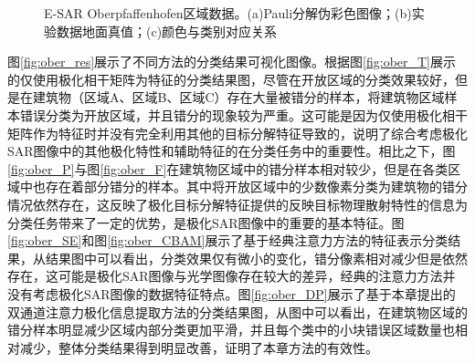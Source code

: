 \begin{figure}[ht]

    \caption{E-SAR Oberpfaffenhofen区域数据。(a)Pauli分解伪彩色图像；(b)实验数据地面真值；(c)颜色与类别对应关系}
\end{figure}

图\ref{fig:ober_res}展示了不同方法的分类结果可视化图像。根据图\ref{fig:ober_T}展示的仅使用极化相干矩阵为特征的分类结果图，尽管在开放区域的分类效果较好，但是在建筑物（区域A、区域B、区域C）存在大量被错分的样本，将建筑物区域样本错误分类为开放区域，并且错分的现象较为严重。这可能是因为仅使用极化相干矩阵作为特征时并没有完全利用其他的目标分解特征导致的，说明了综合考虑极化SAR图像中的其他极化特性和辅助特征的在分类任务中的重要性。相比之下，图\ref{fig:ober_P}与图\ref{fig:ober_F}在建筑物区域中的错分样本相对较少，但是在各类区域中也存在着部分错分的样本。其中将开放区域中的少数像素分类为建筑物的错分情况依然存在，这反映了极化目标分解特征提供的反映目标物理散射特性的信息为分类任务带来了一定的优势，是极化SAR图像中的重要的基本特征。图\ref{fig:ober_SE}和图\ref{fig:ober_CBAM}展示了基于经典注意力方法的特征表示分类结果，从结果图中可以看出，分类效果仅有微小的变化，错分像素相对减少但是依然存在，这可能是极化SAR图像与光学图像存在较大的差异，经典的注意力方法并没有考虑极化SAR图像的数据特征特点。图\ref{fig:ober_DP}展示了基于本章提出的双通道注意力极化信息提取方法的分类结果图，从图中可以看出，在建筑物区域的错分样本明显减少区域内部分类更加平滑，并且每个类中的小块错误区域数量也相对减少，整体分类结果得到明显改善，证明了本章方法的有效性。

